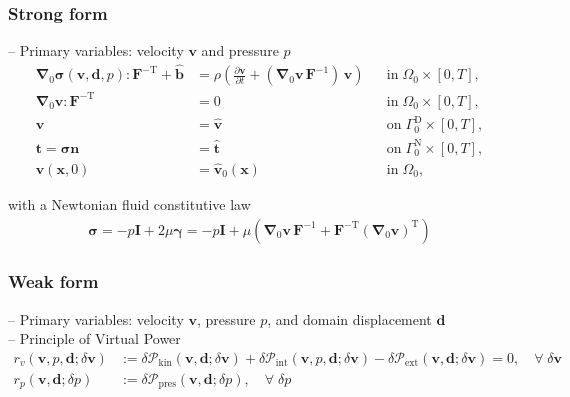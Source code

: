 \documentclass[a4paper,12pt]{report}
\newcommand{\bs}[1]{\boldsymbol{#1}}
\newcommand{\Om}{\mathit{\Omega}}
\newcommand{\Gm}{\mathit{\Gamma}}
\begin{document}
\subsubsection{Strong form}
-- Primary variables: velocity $\bs{v}$ and pressure $p$
\begin{align}
\bs{\nabla}_{0} \bs{\sigma}(\bs{v},\bs{d},p) : \bs{F}^{-\mathrm{T}} + \hat{\bs{b}} &= \rho\left(\frac{\partial\bs{v}}{\partial t} + (\bs{\nabla}_0\bs{v}\,\bs{F}^{-1})\,\bs{v}\right) &&\text{in} \; \mathit{\Om}_0 \times [0, T], \label{eq:divsigma_ns_ale} \\
\bs{\nabla}_{0}\bs{v} : \bs{F}^{-\mathrm{T}} &= 0 &&\text{in} \; \mathit{\Om}_0 \times [0, T],\label{eq:divv_ns_ale}\\
\bs{v} &= \hat{\bs{v}} &&\text{on} \; \mathit{\Gm}_0^{\mathrm{D}} \times [0, T], \label{eq:bc_v_ns_ale}\\
\bs{t} = \bs{\sigma}\bs{n} &= \hat{\bs{t}} &&\text{on} \; \mathit{\Gm}_0^{\mathrm{N}} \times [0, T], \label{eq:bc_N_ns_ale}\\
\bs{v}(\bs{x},0) &= \hat{\bs{v}}_{0}(\bs{x}) &&\text{in} \; \mathit{\Om}_0, \label{eq:ini_v_ns_ale}
\end{align}

with a Newtonian fluid constitutive law
\begin{align}
\bs{\sigma} = -p \bs{I} + 2 \mu \bs{\gamma} = -p \bs{I} + \mu \left(\bs{\nabla}_0 \bs{v}\,\bs{F}^{-1} + \bs{F}^{-\mathrm{T}}(\bs{\nabla}_0 \bs{v})^{\mathrm{T}}\right)
\end{align}

\subsubsection{Weak form}

-- Primary variables: velocity $\bs{v}$, pressure $p$, and domain displacement $\bs{d}$\\

-- Principle of Virtual Power
\begin{align}
r_v(\bs{v},p,\bs{d};\delta\bs{v}) &:= \delta \mathcal{P}_{\mathrm{kin}}(\bs{v},\bs{d};\delta\bs{v}) + \delta \mathcal{P}_{\mathrm{int}}(\bs{v},p,\bs{d};\delta\bs{v}) - \delta \mathcal{P}_{\mathrm{ext}}(\bs{v},\bs{d};\delta\bs{v}) = 0, \quad \forall \; \delta\bs{v} \label{eq:res_v_fluid_ale}\\
r_p(\bs{v},\bs{d};\delta p) &:= \delta \mathcal{P}_{\mathrm{pres}}(\bs{v},\bs{d};\delta p), \quad \forall \; \delta p \label{eq:res_p_fluid_ale}
\end{align}
\end{document}
